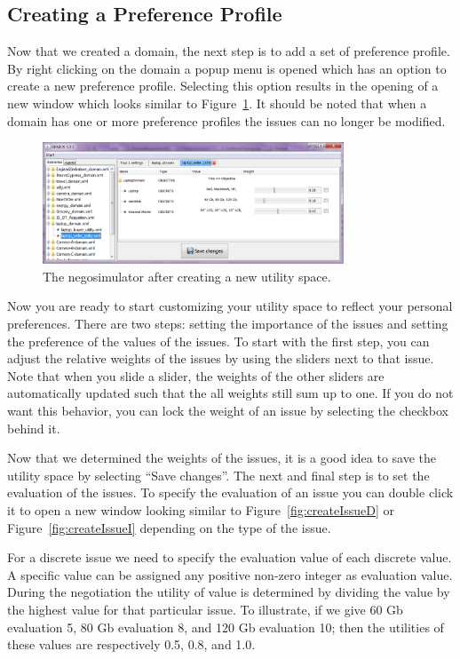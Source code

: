 \documentclass[]{article}
\begin{document}
\subsection{Creating a Preference Profile}
Now that we created a domain, the next step is to add a set of preference profile. By right clicking on the domain a popup menu is opened which has an option to create a new preference profile. Selecting this option results in the opening of a new window which looks similar to Figure~\ref{fig:utilcreated}. It should be noted that when a domain has one or more preference profiles the issues can no longer be modified.

\begin{figure}[htb]
	\centering
	\includegraphics[width=0.8\textwidth]{media/image8.png}
\caption{The negosimulator after creating a new utility space.}\label{fig:utilcreated}
\end{figure}

Now you are ready to start customizing your utility space to reflect your personal preferences. There are two steps: setting the importance of the issues and setting the preference of the values of the issues. To start with the first step, you can adjust the relative weights of the issues by using the sliders next to that issue. Note that when you slide a slider, the weights of the other sliders are automatically updated such that the all weights still sum up to one. If you do not want this behavior, you can lock the weight of an issue by selecting the checkbox behind it.

Now that we determined the weights of the issues, it is a good idea to save the utility space by selecting ``Save changes''. The next and final step is to set the evaluation of the issues. To specify the evaluation of an issue you can double click it to open a new window looking similar to Figure~\ref{fig:createIssueD} or Figure~\ref{fig:createIssueI} depending on the type of the issue.

For a discrete issue we need to specify the evaluation value of each discrete value. A specific value can be assigned any positive non-zero integer as evaluation value. During the negotiation the utility of value is determined by dividing the value by the highest value for that particular issue. To illustrate, if we give 60 Gb evaluation 5, 80 Gb evaluation 8, and 120 Gb evaluation 10; then the utilities of these values are respectively 0.5, 0.8, and 1.0.
\end{document}
